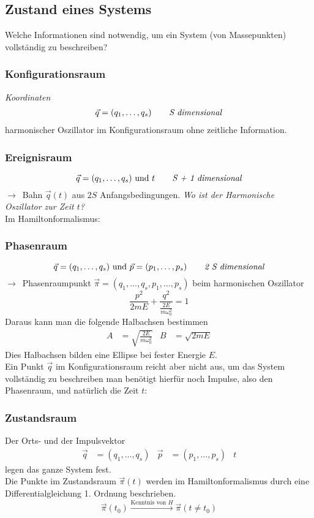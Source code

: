 \documentclass[oneside]{book}
\theoremstyle{definition}
\newcommand{\conseq}{$\rightarrow$~}
\begin{document}
\subsection{Zustand eines Systems}
Welche Informationen sind notwendig, um ein System (von Massepunkten) vollständig zu beschreiben?
\subsubsection{Konfigurationsraum} \textit{Koordinaten}
\begin{align*}
	\vec{q} = (q_1, \dots, q_s) \text{\textit{\qquad S dimensional}}
\end{align*}
harmonischer Oszillator im Konfigurationsraum ohne zeitliche Information.

\subsubsection{Ereignisraum}
$$\vec{q} = (q_1, \dots, q_s) \text{~und~} t \text{\textit{\qquad S + 1 dimensional}}$$
\conseq Bahn $\vec{q}(t)$ aus $2S$ Anfangsbedingungen. \textit{Wo ist der Harmonische Oszillator zur Zeit $t$?}\\

Im Hamiltonformalismus:

\subsubsection{Phasenraum}
$$\vec{q} = (q_1, \dots, q_s) \text{~und~} \vec{p} = (p_1, \dots, p_s) \text{\textit{\qquad 2 S dimensional}}$$
\conseq Phasenraumpunkt $\vec{\pi} = (q_1, \dots, q_s, p_1, \dots, p_s)$
beim harmonischen Oszillator
$$\frac{p^2}{2 m E} + \frac{q^2}{\frac{2 E}{m \omega_0^2}} = 1$$
Daraus kann man die folgende Halbachsen bestimmen
\begin{align*}
A &= \sqrt{\frac{2 E}{m \omega_0^2}}  &   B &= \sqrt{2 m E}
\end{align*}
Dies Halbachsen bilden eine Ellipse bei fester Energie $E$.\\
Ein Punkt $\vec{q}$ im Konfigurationsraum reicht aber nicht aus, um das System vollständig zu beschreiben man benötigt hierfür noch Impulse, also den Phasenraum, und natürlich die Zeit $t$:

\subsubsection{Zustandsraum}
Der Orts- und der Impulsvektor
\begin{align*}
	\vec{q} &= (q_1, \dots, q_s) & \vec{p} &= (p_1, \dots, p_s) & t
\end{align*}
legen das ganze System fest.\\
Die Punkte im Zustandsraum $\vec{\pi} (t)$ werden im Hamiltonformalismus durch eine Differentialgleichung 1. Ordnung beschrieben.
$$\vec{\pi}(t_0) \xrightarrow{\text{Kenntnis von $H$}} \vec{\pi}(t \neq t_0)$$
\end{document}
